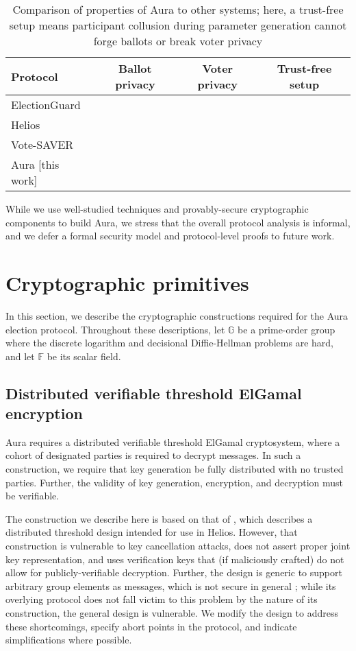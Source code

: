 \documentclass{llncs}
\newcommand{\cmark}{\textcolor{yes}{\ding{51}}}
\newcommand{\xmark}{\textcolor{no}{\ding{55}}}
\newcommand{\G}{\mathbb{G}}
\newcommand{\F}{\mathbb{F}}
\begin{document}
\begin{table}
    \centering
    \caption{Comparison of properties of Aura to other systems; here, a trust-free setup means participant collusion during parameter generation cannot forge ballots or break voter privacy}
    \label{table:comparison}
    \begin{tabular}{l|c|c|c}
        Protocol & Ballot privacy & Voter privacy & Trust-free setup \\
        \hline
        ElectionGuard \cite{electionguard} & \cmark & \xmark & \cmark \\
        Helios \cite{helios2} & \cmark & \xmark & \cmark \\
        Vote-SAVER \cite{saver} & \cmark & \cmark & \xmark \\
        Aura [this work] & \cmark & \cmark & \cmark
    \end{tabular}
\end{table}

While we use well-studied techniques and provably-secure cryptographic components to build Aura, we stress that the overall protocol analysis is informal, and we defer a formal security model and protocol-level proofs to future work.


\section{Cryptographic primitives}

In this section, we describe the cryptographic constructions required for the Aura election protocol.
Throughout these descriptions, let $\G$ be a prime-order group where the discrete logarithm and decisional Diffie-Hellman problems are hard, and let $\F$ be its scalar field.


\subsection{Distributed verifiable threshold ElGamal encryption}

Aura requires a distributed verifiable threshold ElGamal cryptosystem, where a cohort of designated parties is required to decrypt messages.
In such a construction, we require that key generation be fully distributed with no trusted parties.
Further, the validity of key generation, encryption, and decryption must be verifiable.

The construction we describe here is based on that of \cite{cortier}, which describes a distributed threshold design intended for use in Helios.
However, that construction is vulnerable to key cancellation attacks, does not assert proper joint key representation, and uses verification keys that (if maliciously crafted) do not allow for publicly-verifiable decryption.
Further, the design is generic to support arbitrary group elements as messages, which is not secure in general \cite{boneh}; while its overlying protocol does not fall victim to this problem by the nature of its construction, the general design is vulnerable.
We modify the design to address these shortcomings, specify abort points in the protocol, and indicate simplifications where possible.
\end{document}
